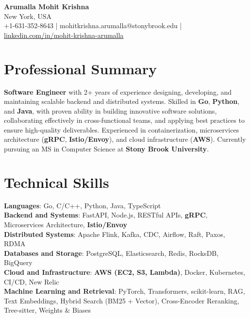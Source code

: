 \documentclass[letterpaper,11pt]{article}
\begin{document}
\begin{center}
  {\Large \textbf{Arumalla Mohit Krishna}} \\
  New York, USA \\
  +1-631-352-8643 \enspace | \enspace mohitkrishna.arumalla@stonybrook.edu \enspace | \enspace \href{https://www.linkedin.com/in/mohit-krishna-arumalla}{linkedin.com/in/mohit-krishna-arumalla}
\end{center}

\section{Professional Summary}
  \begin{itemize}[leftmargin=0.15in, label={}]
    \small{\item{
     \textbf{Software Engineer} with 2+ years of experience designing, developing, and maintaining scalable backend and distributed systems. Skilled in \textbf{Go}, \textbf{Python}, and \textbf{Java}, with proven ability in building innovative software solutions, collaborating effectively in cross-functional teams, and applying best practices to ensure high-quality deliverables. Experienced in containerization, microservices architecture (\textbf{gRPC}, \textbf{Istio/Envoy}), and cloud infrastructure (\textbf{AWS}). Currently pursuing an MS in Computer Science at \textbf{Stony Brook University}.
    }}
  \end{itemize}
\vspace{-16pt}

\section{Technical Skills}
 \begin{itemize}[leftmargin=0.15in, label={}]
    \small{\item{
     \textbf{Languages}: Go, C/C++, Python, Java, TypeScript \\
     \textbf{Backend and Systems}: FastAPI, Node.js, RESTful APIs, \textbf{gRPC}, Microservices Architecture, \textbf{Istio/Envoy} \\
     \textbf{Distributed Systems}: Apache Flink, Kafka, CDC, Airflow, Raft, Paxos, RDMA \\
     \textbf{Databases and Storage}: PostgreSQL, Elasticsearch, Redis, RocksDB, BigQuery \\
     \textbf{Cloud and Infrastructure}: \textbf{AWS (EC2, S3, Lambda)}, Docker, Kubernetes, CI/CD, New Relic \\
     \textbf{Machine Learning and Retrieval}: PyTorch, Transformers, scikit-learn, RAG, Text Embeddings, Hybrid Search (BM25 + Vector), Cross-Encoder Reranking, Tree-sitter, Weights \& Biases
    }}
 \end{itemize}
\vspace{-16pt}
\end{document}
